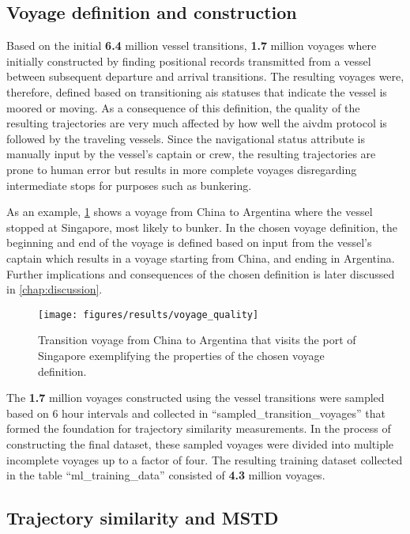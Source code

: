 \subsection{Voyage definition and construction}
\label{sec:results_voyage_definition}

Based on the initial \textbf{6.4} million vessel transitions, \textbf{1.7} million voyages where initially constructed by finding positional records transmitted from a vessel between subsequent departure and arrival transitions. The resulting voyages were, therefore, defined based on transitioning \acrshort{ais} statuses that indicate the vessel is moored or moving. As a consequence of this definition, the quality of the resulting trajectories are very much affected by how well the \gls{aivdm} protocol is followed by the traveling vessels. Since the navigational status attribute is manually input by the vessel's captain or crew, the resulting trajectories are prone to human error but results in more complete voyages disregarding intermediate stops for purposes such as bunkering.

As an example, \cref{fig:transition_voyage} shows a voyage from China to Argentina where the vessel stopped at Singapore, most likely to bunker. In the chosen voyage definition, the beginning and end of the voyage is defined based on input from the vessel's captain which results in a voyage starting from China, and ending in Argentina. Further implications and consequences of the chosen definition is later discussed in \cref{chap:discussion}.

\begin{figure}[htbp]
    \centering
    \texttt{[image: figures/results/voyage\_quality]}
    \caption{Transition voyage from China to Argentina that visits the port of Singapore exemplifying the properties of the chosen voyage definition.}
    \label{fig:transition_voyage}
\end{figure}

The \textbf{1.7} million voyages constructed using the vessel transitions were sampled based on 6 hour intervals and collected in ``sampled\_transition\_voyages'' that formed the foundation for trajectory similarity measurements. In the process of constructing the final dataset, these sampled voyages were divided into multiple incomplete voyages up to a factor of four. The resulting training dataset collected in the table ``ml\_training\_data'' consisted of \textbf{4.3} million voyages.

\subsection{Trajectory similarity and MSTD}

